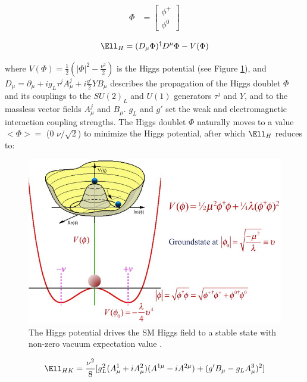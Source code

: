 \begin{align}
	\Phi &= \begin{bmatrix}
	\phi^{+} \\
	\phi^{0}
	\end{bmatrix}
\end{align}

\begin{equation}
	\Ell_{H} = (D_{\mu}\Phi)^{\dagger}D^{\mu}\Phi - V(\Phi)
\end{equation}

where $V(\Phi) = \frac{1}{2}(|\Phi|^{2} - \frac{\nu^{2}}{2})$ is the Higgs potential (see Figure \ref{fig:smHiggsPotential}), and 
$D_{\mu} = \partial_{\mu} + ig_{L}\tau^{j}A^{j}_{\mu} + i\frac{g'}{2}YB_{\mu}$ describes the propagation 
of the Higgs doublet $\Phi$ and its couplings to the $SU(2)_{L}$ and $U(1)$ generators $\tau^{j}$ and $Y$, 
and to the massless vector fields $A^{j}_{\mu}$ and $B_{\mu}$.  $g_{L}$ and 
$g'$ set the weak and electromagnetic interaction coupling strengths.  The Higgs doublet $\Phi$ naturally 
moves to a value $<\Phi> =$ (0  $\nu/\sqrt{2}$) to minimize the Higgs potential, after which $\Ell_{H}$ reduces 
to:

\begin{figure}[h]
	\centering
	\includegraphics[width=1.0\textwidth]{figures/mexicanHatPotential.jpg}
	\caption{The Higgs potential drives the SM Higgs field to a stable state with non-zero vacuum expectation value \cite{higgsPotential}.}
	\label{fig:smHiggsPotential}
\end{figure}

\begin{equation}
	\Ell_{HK} = \frac{\nu^{2}}{8}[g^{2}_{L}(A^{1}_{\mu} + iA^{2}_{\mu})(A^{1\mu} - iA^{2\mu}) + (g'B_{\mu} - g_{L}A^{3}_{\mu})^{2}]
\end{equation}

